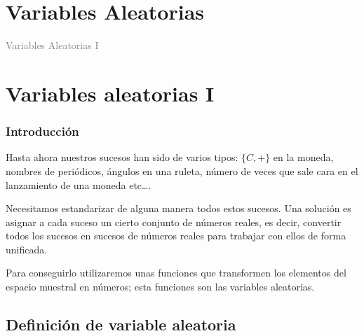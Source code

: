 \documentclass[handout]{beamer}\usepackage[]{graphicx}\usepackage[]{color}
\title[\red{Matemáticas III GINF}]{}
\author[]{R. Alberich}
\date{}
\newcommand{\gray}[1]{\textcolor{gray}{#1}}
\renewcommand{\emph}[1]{{\color{red}#1}}
\theoremstyle{plain}
\theoremstyle{definition}
\begin{document}
\beamertemplatedotitem

\lstset{breaklines=true}
\lstset{basicstyle=\ttfamily}


\section{Variables Aleatorias}

\begin{frame}
\vfill
\begin{center}
\gray{\LARGE Variables Aleatorias I}
\end{center}
\vfill
\end{frame}
\section{Variables aleatorias I}

\begin{frame}
\frametitle{Introducción}
Hasta ahora nuestros sucesos han sido de varios tipos: $\{C,+\}$ en
la moneda, nombres de periódicos, ángulos en una ruleta, número de
veces que sale cara en el lanzamiento de una moneda etc\ldots.

Necesitamos estandarizar de alguna manera todos estos sucesos. Una
solución es asignar a cada suceso un cierto conjunto de
números reales, es decir, convertir todos los sucesos en
\emph{sucesos de números reales} para trabajar con ellos de forma
unificada.

Para conseguirlo utilizaremos  unas funciones que
transformen los elementos del espacio muestral en números; esta funciones son las
variables aleatorias.
\end{frame}



\subsection{Definición de variable aleatoria}
\end{document}
